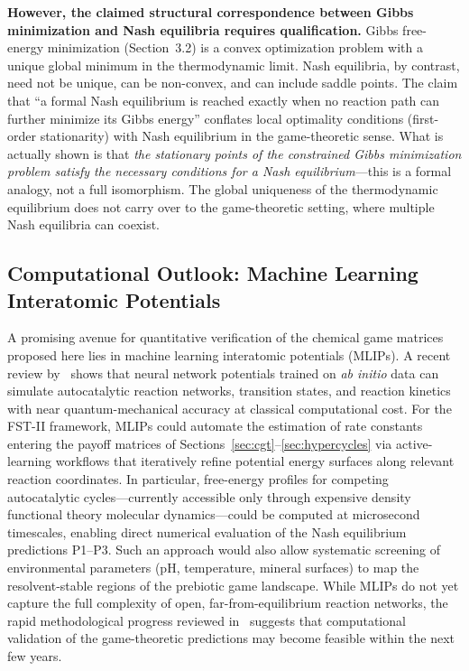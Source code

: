 \documentclass[12pt,a4paper]{article}
\theoremstyle{remark}
\begin{document}
\textbf{However, the claimed structural correspondence between Gibbs minimization and Nash equilibria requires qualification.} Gibbs free-energy minimization (Section~3.2) is a convex optimization problem with a unique global minimum in the thermodynamic limit. Nash equilibria, by contrast, need not be unique, can be non-convex, and can include saddle points. The claim that ``a formal Nash equilibrium is reached exactly when no reaction path can further minimize its Gibbs energy'' conflates local optimality conditions (first-order stationarity) with Nash equilibrium in the game-theoretic sense. What is actually shown is that \emph{the stationary points of the constrained Gibbs minimization problem satisfy the necessary conditions for a Nash equilibrium}---this is a formal analogy, not a full isomorphism. The global uniqueness of the thermodynamic equilibrium does not carry over to the game-theoretic setting, where multiple Nash equilibria can coexist.

\subsection{Computational Outlook: Machine Learning Interatomic Potentials}

A promising avenue for quantitative verification of the chemical game matrices proposed here lies in machine learning interatomic potentials (MLIPs). A recent review by~\citet{AntonStirnemann2026} shows that neural network potentials trained on \textit{ab initio} data can simulate autocatalytic reaction networks, transition states, and reaction kinetics with near quantum-mechanical accuracy at classical computational cost. For the FST-II framework, MLIPs could automate the estimation of rate constants entering the payoff matrices of Sections~\ref{sec:cgt}--\ref{sec:hypercycles} via active-learning workflows that iteratively refine potential energy surfaces along relevant reaction coordinates. In particular, free-energy profiles for competing autocatalytic cycles---currently accessible only through expensive density functional theory molecular dynamics---could be computed at microsecond timescales, enabling direct numerical evaluation of the Nash equilibrium predictions P1--P3. Such an approach would also allow systematic screening of environmental parameters (pH, temperature, mineral surfaces) to map the resolvent-stable regions of the prebiotic game landscape. While MLIPs do not yet capture the full complexity of open, far-from-equilibrium reaction networks, the rapid methodological progress reviewed in~\citep{AntonStirnemann2026} suggests that computational validation of the game-theoretic predictions may become feasible within the next few years.
\end{document}
